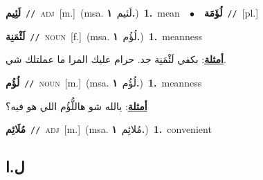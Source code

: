 \documentclass[10pt,a4paper,twoside]{article} %
\begin{document}
\begin{multicols}{2}
{\setlength\topsep{0pt}\textbf{\foreignlanguage{arabic}{لَئِيم}}\ {\color{gray}\texttt{//}\color{black}}\ \textsc{adj}\ [m.]\ \color{gray}(msa. \foreignlanguage{arabic}{لَئيم}~\foreignlanguage{arabic}{\textbf{١.}})\color{black}\ \textbf{1.}~mean\ \ $\bullet$\ \ \setlength\topsep{0pt}\textbf{\foreignlanguage{arabic}{لُؤَمَة}}\ {\color{gray}\texttt{//}\color{black}}\ [pl.]\ } \vspace{2mm}

{\setlength\topsep{0pt}\textbf{\foreignlanguage{arabic}{لَئْمَنِة}}\ {\color{gray}\texttt{//}\color{black}}\ \textsc{noun}\ [f.]\ \color{gray}(msa. \foreignlanguage{arabic}{لُؤُم}~\foreignlanguage{arabic}{\textbf{١.}})\color{black}\ \textbf{1.}~meanness\  \begin{flushright}\color{gray}\foreignlanguage{arabic}{\textbf{\underline{\foreignlanguage{arabic}{أمثلة}}}: بكفي لَئْمَنِة جد. حرام عليك المرا ما عملتلك شي.}\end{flushright}\color{black}} \vspace{2mm}

{\setlength\topsep{0pt}\textbf{\foreignlanguage{arabic}{لُؤُم}}\ {\color{gray}\texttt{//}\color{black}}\ \textsc{noun}\ [m.]\ \color{gray}(msa. \foreignlanguage{arabic}{لُؤُم}~\foreignlanguage{arabic}{\textbf{١.}})\color{black}\ \textbf{1.}~meanness\  \begin{flushright}\color{gray}\foreignlanguage{arabic}{\textbf{\underline{\foreignlanguage{arabic}{أمثلة}}}: يالله شو هاللُّؤُم اللي هو فيه؟}\end{flushright}\color{black}} \vspace{2mm}

{\setlength\topsep{0pt}\textbf{\foreignlanguage{arabic}{مُلَائِم}}\ {\color{gray}\texttt{//}\color{black}}\ \textsc{adj}\ [m.]\ \color{gray}(msa. \foreignlanguage{arabic}{مُلائِم}~\foreignlanguage{arabic}{\textbf{١.}})\color{black}\ \textbf{1.}~convenient\ } \vspace{2mm}

\vspace{-3mm}
\subsection*{\color{blue}\foreignlanguage{arabic}{ل.ا}\color{blue}{ (ntws)}} 


\end{multicols}
\end{document}
